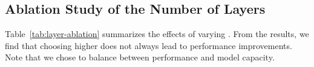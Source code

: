 \documentclass[10pt,twocolumn,letterpaper]{article}
\begin{document}
\subsection{Ablation Study of the Number of Layers  }\vspace{-10pt}
\begin{table}[H]
    \centering
    \vspace{-5pt}
    \caption{\textbf{Effects of varying .}
    }
    \label{tab:layer-ablation}
    \vspace{-10pt}

\end{table} Table~\ref{tab:layer-ablation} summarizes the effects of varying . From the results, we find that choosing higher  does not always lead to performance improvements.
Note that we chose  to balance between performance and model capacity.
\end{document}

